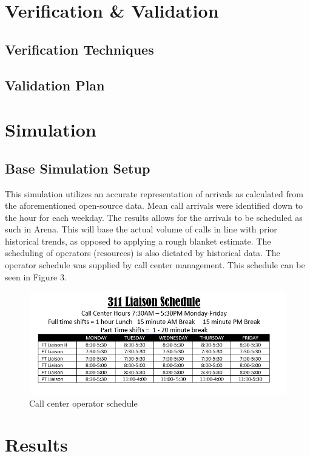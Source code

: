 \documentclass[12pt,twocolumn]{article}
\begin{document}
\section{Verification \& Validation}

	\subsection{Verification Techniques}
	
	
	\subsection{Validation Plan}
	
	
\section{Simulation}

	\subsection{Base Simulation Setup}
This simulation utilizes an accurate representation of arrivals as calculated from the aforementioned open-source data.  Mean call arrivals were identified down to the hour for each weekday.  The results allows for the arrivals to be scheduled as such in Arena.  This will base the actual volume of calls in line with prior historical trends, as opposed to applying a rough blanket estimate.  The scheduling of operators (resources) is also dictated by historical data.  The operator schedule was supplied by call center management.  This schedule can be seen in Figure 3.  

	\begin{figure}[h]
	\includegraphics[scale=.35]{schedule2.jpg}
	\caption{Call center operator schedule}
	\end{figure}

\section{Results}
\end{document}
